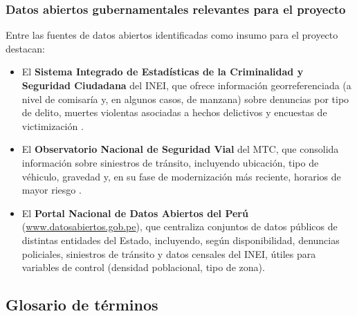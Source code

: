 \documentclass[12pt,letterpaper]{report}
\begin{document}
\subsubsection{Datos abiertos gubernamentales relevantes para el proyecto}
Entre las fuentes de datos abiertos identificadas como insumo para el proyecto destacan:
\begin{itemize}
    \item El \textbf{Sistema Integrado de Estad\'isticas de la Criminalidad y Seguridad Ciudadana} del INEI, que ofrece informaci\'on georreferenciada (a nivel de comisar\'ia y, en algunos casos, de manzana) sobre denuncias por tipo de delito, muertes violentas asociadas a hechos delictivos y encuestas de victimizaci\'on \citep{inei2022sistema,bid2020buenapractica}.
    \item El \textbf{Observatorio Nacional de Seguridad Vial} del MTC, que consolida informaci\'on sobre siniestros de tr\'ansito, incluyendo ubicaci\'on, tipo de v\'ehiculo, gravedad y, en su fase de modernizaci\'on m\'as reciente, horarios de mayor riesgo \citep{mtc2024observatorio}.
    \item El \textbf{Portal Nacional de Datos Abiertos del Per\'u} (\url{www.datosabiertos.gob.pe}), que centraliza conjuntos de datos p\'ublicos de distintas entidades del Estado, incluyendo, seg\'un disponibilidad, denuncias policiales, siniestros de tr\'ansito y datos censales del INEI, \'utiles para variables de control (densidad poblacional, tipo de zona).
\end{itemize}

\subsection{Glosario de t\'erminos}
\end{document}
